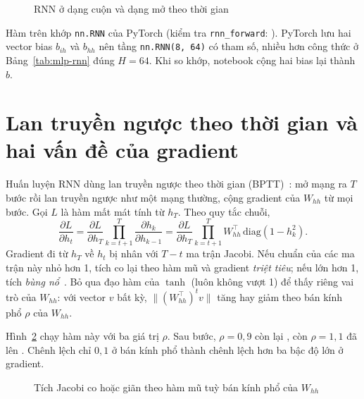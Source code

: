 \begin{figure}[H]
  \centering
  \caption{RNN ở dạng cuộn và dạng mở theo thời gian}
  \label{fig:unroll}
\end{figure}


Hàm trên khớp \texttt{nn.RNN} của PyTorch (kiểm tra \texttt{rnn\_forward}: ). PyTorch lưu
hai vector bias $b_{ih}$ và $b_{hh}$ nên tầng \texttt{nn.RNN(8, 64)} có  tham số, nhiều hơn
công thức ở Bảng~\ref{tab:mlp-rnn} đúng $H = 64$. Khi so khớp, notebook cộng hai bias lại thành $b$.

\section{Lan truyền ngược theo thời gian và hai vấn đề của gradient}

Huấn luyện RNN dùng lan truyền ngược theo thời gian (BPTT)~\cite{werbos1990}: mở mạng ra $T$ bước rồi lan truyền
ngược như một mạng thường, cộng gradient của $W_{hh}$ từ mọi bước. Gọi $L$ là hàm mất mát tính từ $h_T$. Theo quy tắc
chuỗi,
\begin{equation}
  \frac{\partial L}{\partial h_t}
  = \frac{\partial L}{\partial h_T} \prod_{k=t+1}^{T} \frac{\partial h_k}{\partial h_{k-1}}
  = \frac{\partial L}{\partial h_T} \prod_{k=t+1}^{T} W_{hh}^\top\, \mathrm{diag}\!\left(1 - h_k^2\right).
  \label{eq:bptt}
\end{equation}
Gradient đi từ $h_T$ về $h_t$ bị nhân với $T - t$ ma trận Jacobi. Nếu chuẩn của các ma trận này nhỏ hơn 1, tích co lại
theo hàm mũ và gradient \emph{triệt tiêu}; nếu lớn hơn 1, tích \emph{bùng nổ}~\cite{bengio1994,pascanu2013}. Bỏ qua
đạo hàm của $\tanh$ (luôn không vượt 1) để thấy riêng vai trò của $W_{hh}$: với vector $v$ bất kỳ,
$\lVert (W_{hh}^\top)^t v \rVert$ tăng hay giảm theo bán kính phổ $\rho$ của $W_{hh}$.


Hình~\ref{fig:rho} chạy hàm này với ba giá trị $\rho$. Sau  bước, $\rho = 0{,}9$ còn lại
, còn $\rho = 1{,}1$ đã lên . Chênh lệch chỉ $0{,}1$ ở bán kính phổ
thành chênh lệch hơn ba bậc độ lớn ở gradient.

\begin{figure}[H]
  \centering
  \caption{Tích Jacobi co hoặc giãn theo hàm mũ tuỳ bán kính phổ của $W_{hh}$}
  \label{fig:rho}
\end{figure}

